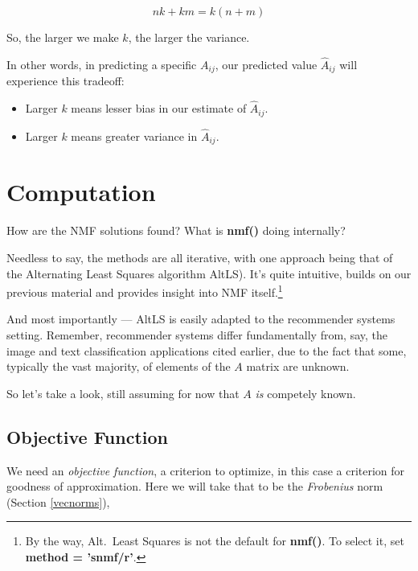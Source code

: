 \begin{equation}
nk + km = k(n+m)
\end{equation}

So, the larger we make $k$, the larger the variance.

In other words, in predicting a specific $A_{ij}$, our predicted value
$\widehat{A}_{ij}$ will experience this tradeoff:

\begin{itemize}

\item Larger $k$ means lesser bias in our estimate of $\widehat{A}_{ij}$.

\item Larger $k$ means greater variance in $\widehat{A}_{ij}$.

\end{itemize} 

\section{Computation}
\label{nmfcomp}

How are the NMF solutions found?  What is {\bf nmf()} doing internally?

Needless to say, the methods are all iterative, with one approach being
that of the Alternating Least Squares algorithm AltLS).  It's quite
intuitive, builds on our previous material and provides insight into NMF
itself.\footnote{By the way, Alt.\ Least Squares is not the default for
{\bf nmf()}.  To select it, set {\bf method = 'snmf/r'}.}

And most importantly ---  AltLS is easily adapted to the recommender
systems setting.  Remember, recommender systems differ fundamentally
from, say, the image and text classification applications cited earlier,
due to the fact that some, typically the vast majority, of elements of
the $A$ matrix are unknown.  

So let's take a look, still assuming for now that $A$ \textit{is}
competely known.


\subsection{Objective Function}

We need an {\it objective function}, a criterion to optimize, in this
case a criterion for goodness of approximation. Here we will take that
to be the {\it Frobenius} norm (Section \ref{vecnorms}),

